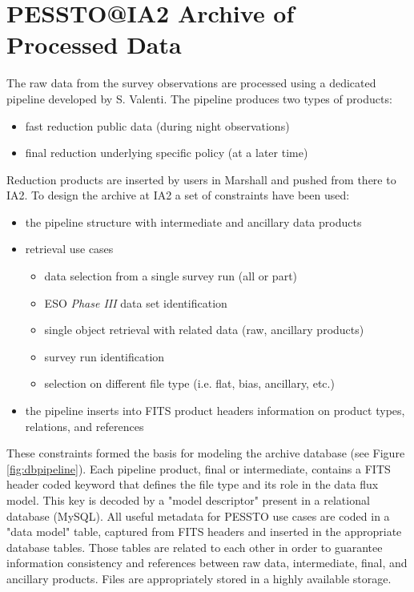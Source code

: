 \section{PESSTO@IA2 Archive of Processed Data}\label{ia2archive}

The raw data from the survey observations are processed using a dedicated pipeline developed by S. Valenti. The pipeline produces two types of products:
\begin{itemize}[noitemsep,nolistsep]
	\item fast reduction public data (during night observations)
	\item final reduction underlying specific policy (at a later time)
\end{itemize}
Reduction products are inserted by users in Marshall and pushed from there to IA2. 
To design the archive at IA2 a set of constraints have been used:
\begin{itemize}[noitemsep,nolistsep]
	\item the pipeline structure with intermediate and ancillary data products
	\item retrieval use cases
		\begin{itemize}[noitemsep,nolistsep]
			\item data selection from a single survey run (all or part)
			\item ESO \textit{Phase III} data set identification
			\item single object retrieval with related data (raw, ancillary products)
			\item survey run identification
			\item selection on different file type (i.e. flat, bias, ancillary, etc.)
		\end{itemize}
	\item the pipeline inserts into FITS product headers information on product types, relations, and references
\end{itemize}
These constraints formed the basis for modeling the archive database (see Figure \ref{fig:dbpipeline}). Each pipeline product, final or intermediate, contains a FITS header coded keyword that defines the file type and its role in the data flux model. This key is decoded by a "model descriptor" present in a relational database (MySQL). All useful metadata for PESSTO use cases are coded in a "data model" table, captured from FITS headers and inserted in the appropriate database tables. Those tables are related to each other in order to guarantee information consistency and references between raw data, intermediate, final, and ancillary products. Files are appropriately stored in a highly available storage.
